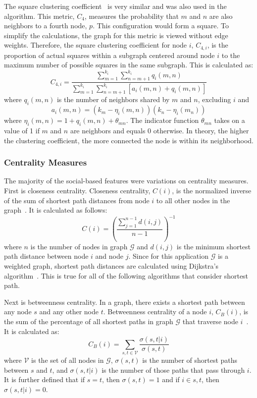 \documentclass[12pt]{report}
\begin{document}
The square clustering coefficient~\cite{lind_cycles_2005} is very similar and was also used in the algorithm.
This metric, $C_4$, measures the probability that $m$ and $n$ are also neighbors to a fourth node, $p$.
This configuration would form a square.
To simplify the calculations, the graph for this metric is viewed without edge weights.
Therefore, the square clustering coefficient for node $i$, $C_{4,i}$, is the proportion of actual squares within a subgraph centered around node $i$ to the maximum number of possible squares in the same subgraph.
This is calculated as:
\begin{equation}
C_{4,i} = \frac{\sum_{m=1}^{k_i}\sum_{n=m+1}^{k_i}q_i(m,n)}{\sum_{m=1}^{k_i} \sum_{n=m+1}^{k_i}\left[a_i(m,n)+q_i(m,n) \right]}
\end{equation}
where $q_i(m,n)$ is the number of neighbors shared by $m$ and $n$, excluding $i$ and 
\begin{equation}
a_i(m,n) = (k_m-\eta_i(m,n))(k_n-\eta_i(m_n)) 
\end{equation}
where $\eta_i(m,n) = 1+q_i(m,n)+\theta_{mn}$.  
The indicator function $\theta_{mn}$ takes on a value of 1 if $m$ and $n$ are neighbors and equals 0 otherwise.
In theory, the higher the clustering coefficient, the more connected the node is within its neighborhood.

\subsubsection{Centrality Measures}
The majority of the social-based features were variations on centrality measures.
First is closeness centrality.
Closeness centrality, $C(i)$, is the normalized inverse of the sum of shortest path distances from node $i$ to all other nodes in the graph~\cite{freeman_centrality_1978}.  It is calculated as follows:
\begin{equation}
C(i) = \left(\frac{\sum_{j=1}^{n-1}d(i,j)}{n-1}\right)^{-1}
\end{equation}
where $n$ is the number of nodes in graph $\mathcal{G}$ and $d(i,j)$ is the minimum shortest path distance between node $i$ and node $j$.
Since for this application $\mathcal{G}$ is a weighted graph, shortest path distances are calculated using Dijkstra's algorithm~\cite{dijkstra1959note}.
This is true for all of the following algorithms that consider shortest path.

Next is betweenness centrality.
In a graph, there exists a shortest path between any node $s$ and any other node $t$.  Betweenness centrality of a node $i$, $C_B(i)$, is the sum of the percentage of all shortest paths in graph $\mathcal{G}$ that traverse node $i$~\cite{freeman_set_1977}.
It is calculated as:
\begin{equation}
C_B(i) = \sum_{s,t\in \mathcal{V}}\frac{\sigma(s,t|i)}{\sigma(s,t)}
\end{equation}
where $\mathcal{V}$ is the set of all nodes in $\mathcal{G}$, $\sigma(s,t)$ is the number of shortest paths between $s$ and $t$, and $\sigma(s,t|i)$ is the number of those paths that pass through $i$.
It is further defined that if $s=t$, then $\sigma(s,t)=1$ and if $i\in s,t$, then $\sigma(s,t|i) = 0$.
\end{document}
